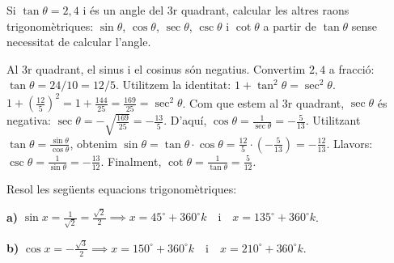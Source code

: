 \documentclass[12pt,a4paper,answers]{exam} %
\begin{document}
\begin{questions}
    \question Si $\tan \theta=2,4$ i és un angle del 3r quadrant, calcular les altres raons trigonomètriques: $\sin \theta$, $\cos \theta$, $\sec \theta$, $\csc \theta$ i $\cot \theta$ a partir de $\tan \theta$ sense necessitat de calcular l'angle.

    \begin{solution}
        Al 3r quadrant, el sinus i el cosinus són negatius. Convertim $2,4$ a fracció: $\tan \theta = 24/10 = 12/5$.
        Utilitzem la identitat: $1 + \tan^2 \theta = \sec^2 \theta$.
        $1 + \left(\frac{12}{5}\right)^2 = 1 + \frac{144}{25} = \frac{169}{25} = \sec^2 \theta$.
        Com que estem al 3r quadrant, $\sec \theta$ és negativa: $\sec \theta = -\sqrt{\frac{169}{25}} = -\frac{13}{5}$.
        D'aquí, $\cos \theta = \frac{1}{\sec \theta} = -\frac{5}{13}$.
        Utilitzant $\tan \theta = \frac{\sin \theta}{\cos \theta}$, obtenim $\sin \theta = \tan \theta \cdot \cos \theta = \frac{12}{5} \cdot \left(-\frac{5}{13}\right) = -\frac{12}{13}$.
        Llavors: $\csc \theta = \frac{1}{\sin \theta} = -\frac{13}{12}$.
        Finalment, $\cot \theta = \frac{1}{\tan \theta} = \frac{5}{12}$.
    \end{solution}

    \question Resol les següents equacions trigonomètriques:

    \begin{solution}
        \textbf{a)} $\sin x = \frac{1}{\sqrt{2}} = \frac{\sqrt{2}}{2} \implies x = 45^\circ + 360^\circ k \quad \text{i} \quad x = 135^\circ + 360^\circ k$.
        
        \textbf{b)} $\cos x = -\frac{\sqrt{3}}{2} \implies x = 150^\circ + 360^\circ k \quad \text{i} \quad x = 210^\circ + 360^\circ k$.
        

\end{solution}
\end{questions}
\end{document}
